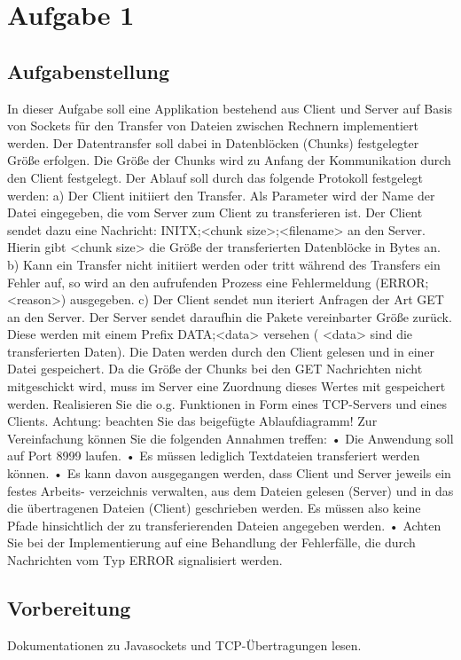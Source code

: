 \newpage

\section{Aufgabe 1}

\subsection{Aufgabenstellung}
In dieser Aufgabe soll eine Applikation bestehend aus Client und Server auf Basis von Sockets für den Transfer von Dateien zwischen Rechnern implementiert werden. Der Datentransfer soll dabei in Datenblöcken (Chunks) festgelegter Größe erfolgen. Die Größe der Chunks wird zu Anfang der Kommunikation durch den Client festgelegt. Der Ablauf soll durch das folgende Protokoll festgelegt werden:
a) Der Client initiiert den Transfer. Als Parameter wird der Name der Datei eingegeben, die vom Server zum Client zu transferieren ist. Der Client sendet dazu eine Nachricht: INITX;<chunk size>;<filename> an den Server. Hierin gibt <chunk size> die Größe der transferierten Datenblöcke in Bytes an.
b) Kann ein Transfer nicht initiiert werden oder tritt während des Transfers ein Fehler auf, so wird an den aufrufenden Prozess eine Fehlermeldung (ERROR;<reason>) ausgegeben.
c) Der Client sendet nun iteriert Anfragen der Art GET an den Server. Der Server sendet daraufhin die Pakete vereinbarter Größe zurück. Diese werden mit einem Prefix DATA;<data> versehen ( <data> sind die transferierten Daten). Die Daten werden durch den Client gelesen und in einer Datei gespeichert. Da die Größe der Chunks bei den GET Nachrichten nicht mitgeschickt wird, muss im Server eine Zuordnung dieses Wertes mit gespeichert werden. Realisieren Sie die o.g. Funktionen in Form eines TCP-Servers und eines Clients. Achtung: beachten Sie das beigefügte Ablaufdiagramm!
Zur Vereinfachung können Sie die folgenden Annahmen treffen:
• Die Anwendung soll auf Port 8999 laufen.
• Es müssen lediglich Textdateien transferiert werden können.
• Es kann davon ausgegangen werden, dass Client und Server jeweils ein festes Arbeits- verzeichnis verwalten, aus dem Dateien gelesen (Server) und in das die übertragenen Dateien (Client) geschrieben werden. Es müssen also keine Pfade hinsichtlich der zu transferierenden Dateien angegeben werden.
• Achten Sie bei der Implementierung auf eine Behandlung der Fehlerfälle, die durch Nachrichten vom Typ ERROR signalisiert werden.

\subsection{Vorbereitung}
Dokumentationen zu Javasockets und TCP-Übertragungen lesen.

